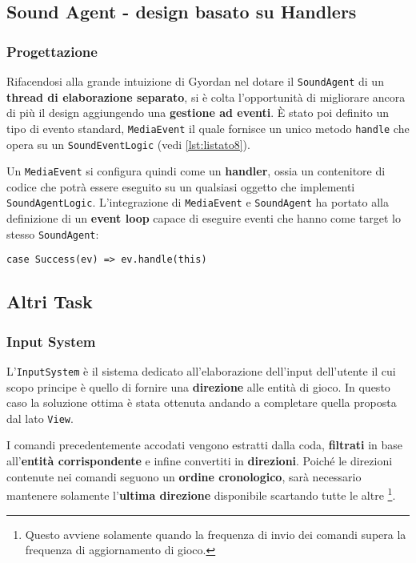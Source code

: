 \subsection{Sound Agent - design basato su Handlers}
\label{subsec:media_event}
\subsubsection{Progettazione}
Rifacendosi alla grande intuizione di Gyordan nel dotare il \texttt{SoundAgent} di un \textbf{thread di elaborazione separato}, si è colta l'opportunità di migliorare ancora di più il design aggiungendo una \textbf{gestione ad eventi}. È stato poi definito un tipo di evento standard, \texttt{MediaEvent} il quale fornisce un unico metodo \texttt{handle} che opera su un \texttt{SoundEventLogic} (vedi \ref{lst:listato8}).



Un \texttt{MediaEvent} si configura quindi come un \textbf{handler}, ossia un contenitore di codice che potrà essere eseguito su un qualsiasi oggetto che implementi \texttt{SoundAgentLogic}. L'integrazione di \texttt{MediaEvent} e \texttt{SoundAgent} ha portato alla definizione di un \textbf{event loop} capace di eseguire eventi che hanno come target lo stesso \texttt{SoundAgent}:
\begin{verbatim}
case Success(ev) => ev.handle(this)
\end{verbatim}

\subsection{Altri Task}
\subsubsection{Input System}
\label{subsubsec:input_sys}
L'\texttt{InputSystem} è il sistema dedicato all'elaborazione dell'input dell'utente il cui scopo principe è quello di fornire una \textbf{direzione} alle entità di gioco. In questo caso la soluzione ottima è stata ottenuta andando a completare quella proposta dal lato \texttt{View}.

I comandi precedentemente accodati vengono estratti dalla coda, \textbf{filtrati} in base all'\textbf{entità corrispondente} e infine convertiti in \textbf{direzioni}. Poiché le direzioni contenute nei comandi seguono un \textbf{ordine cronologico}, sarà necessario mantenere solamente l'\textbf{ultima direzione} disponibile scartando tutte le altre \footnote{Questo avviene solamente quando la frequenza di invio dei comandi supera la frequenza di aggiornamento di gioco.}. 

